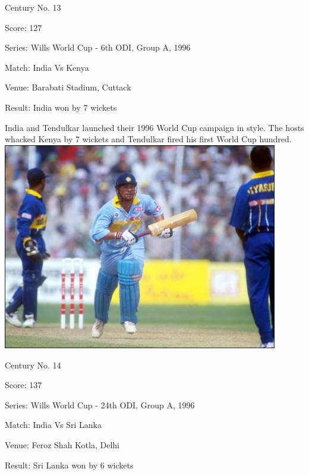 \documentclass[11pt, a4paper]{article}
\begin{document}
Century No. 13 

Score: 127 

Series: Wills World Cup - 6th ODI, Group A, 1996 

Match: India Vs Kenya 

Venue: Barabati Stadium, Cuttack 

Result: India won by 7 wickets 

India and Tendulkar launched their 1996 World Cup campaign in style. The hosts whacked Kenya by 7 wickets and Tendulkar fired his first World Cup hundred.
\newpage
\includegraphics[width=0.9\textwidth]{pics/14.jpg}

Century No. 14 

Score: 137 

Series: Wills World Cup - 24th ODI, Group A, 1996 

Match: India Vs Sri Lanka 

Venue: Feroz Shah Kotla, Delhi 

Result: Sri Lanka won by 6 wickets 
\end{document}
